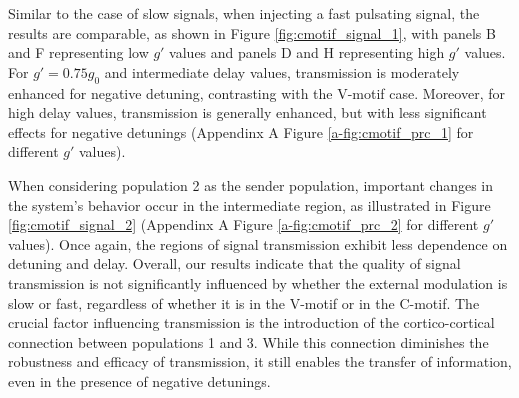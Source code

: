 \documentclass[../main.tex]{subfiles}
\begin{document}
Similar to the case of slow signals, when injecting a fast pulsating signal, the results are comparable, as shown in Figure \ref{fig:cmotif_signal_1}, with panels B and F representing low $g'$ values and panels D and H representing high $g'$ values.
For $g' = 0.75g_0$ and intermediate delay values, transmission is moderately enhanced for negative detuning, contrasting with the V-motif case.
Moreover, for high delay values, transmission is generally enhanced, but with less significant effects for negative detunings (Appendinx A Figure \ref{a-fig:cmotif_prc_1} for different $g'$ values).

When considering population 2 as the sender population, important changes in the system's behavior occur in the intermediate region, as illustrated in Figure \ref{fig:cmotif_signal_2} (Appendinx A Figure \ref{a-fig:cmotif_prc_2} for different $g'$ values).
Once again, the regions of signal transmission exhibit less dependence on detuning and delay.
Overall, our results indicate that the quality of signal transmission is not significantly influenced by whether the external modulation is slow or fast, regardless of whether it is in the V-motif or in the C-motif.
The crucial factor influencing transmission is the introduction of the cortico-cortical connection between populations 1 and 3.
While this connection diminishes the robustness and efficacy of transmission, it still enables the transfer of information, even in the presence of negative detunings.
\end{document}
